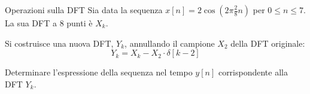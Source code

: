 
\begin{esercizio}{Operazioni sulla DFT}
    Sia data la sequenza $x[n] = 2\cos\left(2\pi \frac{2}{8}n\right)$ per $0 \le n \le 7$. La sua DFT a 8 punti è $X_k$.
    
    Si costruisce una nuova DFT, $Y_k$, annullando il campione $X_2$ della DFT originale:
    \[
        Y_k = X_k - X_2 \cdot \delta[k-2]
    \]
    
    Determinare l'espressione della sequenza nel tempo $y[n]$ corrispondente alla DFT $Y_k$.
\end{esercizio}